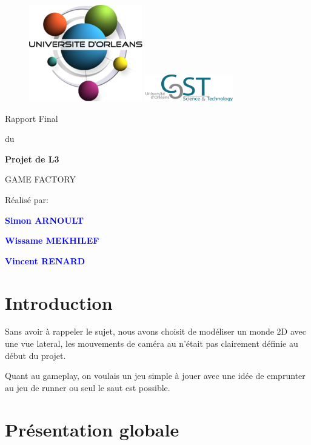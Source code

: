 \documentclass[french,12pt]{article}
\newcommand{\ml}[0]{\par\noindent}
\begin{document}
\thispagestyle{empty}
%
\begin{figure}[H]
\includegraphics[width=0.2\linewidth]{logo_univ.png}
\hfill
\includegraphics[width=1.5in]{logo_ufr.png}
\end{figure}
\vspace{2cm}
%
\begin{center}
{\Huge Rapport Final}
\par\vspace{0.4cm}
{\Large du}
\par\vspace{0.4cm}
{\Huge\bf Projet de L3}
\par\vspace{3cm}
{\Huge       GAME FACTORY}
\par\vspace{3cm}
{\Huge       Réalisé par:}

\par\vspace{0.3cm}
{\Huge\bf \textcolor{blue}{Simon ARNOULT}}
\par\vspace{0.3cm}
{\Huge\bf \textcolor{blue}{Wissame MEKHILEF}}
\par\vspace{0.3cm}
{\Huge\bf \textcolor{blue}{Vincent RENARD}}

\end{center}
\newpage
\tableofcontents
\newpage


\section{Introduction}

Sans avoir à rappeler le sujet, nous avons choisit de modéliser un monde 2D avec une vue lateral, les mouvements de caméra au n'était pas clairement définie au début du projet.
\ml
Quant au gameplay, on voulais un jeu simple à jouer avec une idée de emprunter au jeu de runner ou seul le saut est possible.

\section{Présentation globale}

\end{document}
